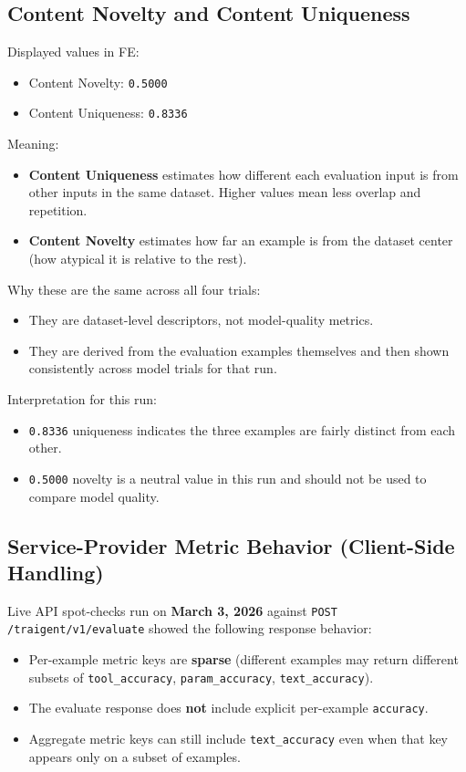 \documentclass[11pt]{article}
\begin{document}
\subsection{Content Novelty and Content Uniqueness}

Displayed values in FE:
\begin{itemize}
    \item Content Novelty: \texttt{0.5000}
    \item Content Uniqueness: \texttt{0.8336}
\end{itemize}

Meaning:
\begin{itemize}
    \item \textbf{Content Uniqueness} estimates how different each evaluation input is from other inputs in the same dataset. Higher values mean less overlap and repetition.
    \item \textbf{Content Novelty} estimates how far an example is from the dataset center (how atypical it is relative to the rest).
\end{itemize}

Why these are the same across all four trials:
\begin{itemize}
    \item They are dataset-level descriptors, not model-quality metrics.
    \item They are derived from the evaluation examples themselves and then shown consistently across model trials for that run.
\end{itemize}

Interpretation for this run:
\begin{itemize}
    \item \texttt{0.8336} uniqueness indicates the three examples are fairly distinct from each other.
    \item \texttt{0.5000} novelty is a neutral value in this run and should not be used to compare model quality.
\end{itemize}

\subsection{Service-Provider Metric Behavior (Client-Side Handling)}

Live API spot-checks run on \textbf{March 3, 2026} against \texttt{POST /traigent/v1/evaluate} showed the following response behavior:
\begin{itemize}
    \item Per-example metric keys are \textbf{sparse} (different examples may return different subsets of \texttt{tool\_accuracy}, \texttt{param\_accuracy}, \texttt{text\_accuracy}).
    \item The evaluate response does \textbf{not} include explicit per-example \texttt{accuracy}.
    \item Aggregate metric keys can still include \texttt{text\_accuracy} even when that key appears only on a subset of examples.
\end{itemize}
\end{document}
